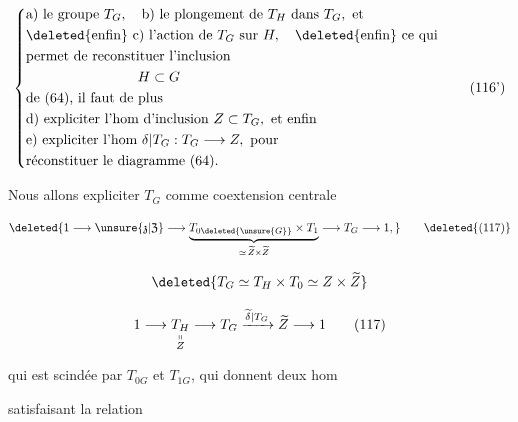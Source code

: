 \[\left\{\begin{aligned}
&\text{a) le groupe }T_G,\quad\text{b) le plongement de }T_H\text{ dans }T_G,\text{ et}\\
&\text{\deleted{enfin} c) l'action de }T_G\text{ sur }H,\quad\text{\deleted{enfin} ce qui}\\
&\text{permet de reconstituer l'inclusion}\\
&\hspace{8em}H\subset G\\
&\text{de (64), il faut de plus}\\
&\text{d) expliciter l'hom d'inclusion } Z\subset T_G,\text{ et enfin}\\
&\text{e) expliciter l'hom }\delta|T_G:T_G\longrightarrow Z,\text{ pour}\\
&\text{réconstituer le diagramme (64).}
\end{aligned}\right.\tag*{(116')}\]

Nous allons expliciter $T_G$  comme coextension centrale

\[\deleted{1\longrightarrow\unsure{\mathfrak{z}|\mathfrak{Z}}\longrightarrow
\underbrace{T_{0\deleted{\unsure{G}}}\times T_1}_{\simeq\,\widetilde Z\times\widetilde Z}
\longrightarrow T_G\longrightarrow 1,}\tag*{\deleted{(117)}}\]

 

\[\deleted{T_G\simeq T_H\times T_0\simeq Z\times\widetilde Z}\]


\[1\longrightarrow\underset{\substack{\shortparallel\\Z}}{T_H}\longrightarrow T_G\xrightarrow{\widetilde\delta|T_G}\widetilde Z\longrightarrow1\tag*{(117)}\]

qui est scindée par $T_{0G}$ et $T_{1G}$, qui donnent deux  hom


satisfaisant la relation

